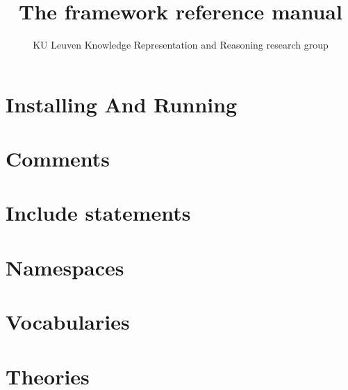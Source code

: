 \documentclass[a4]{article}
\title{The \idp framework reference manual}
\author{KU Leuven Knowledge Representation and Reasoning research group}
\begin{document}
\maketitle
\setlength{\parindent}{0pt}
\newpage
\tableofcontents
\newpage



\section{Installing And Running}


\section{Comments}


\section{Include statements}


\section{Namespaces}


\section{Vocabularies}


\section{Theories}


\end{document}
